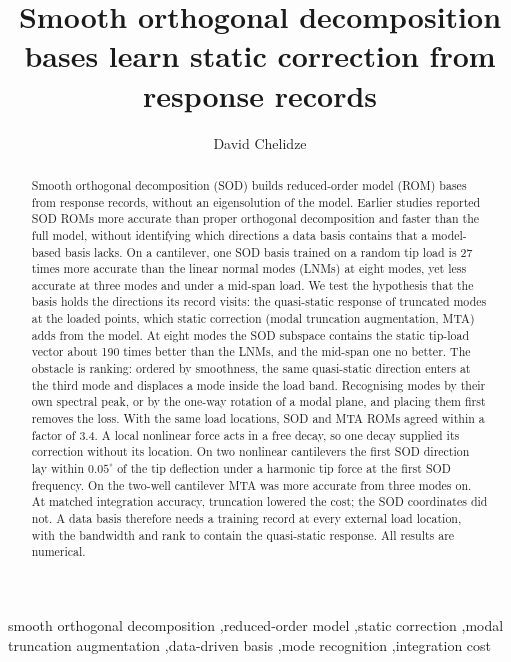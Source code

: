 \documentclass[preprint,12pt]{elsarticle}
\begin{document}
\begin{frontmatter}
\title{Smooth orthogonal decomposition bases learn static correction from response records}
\author[nld]{David Chelidze}


\begin{abstract}
Smooth orthogonal decomposition (SOD) builds reduced-order model (ROM) bases from response records, without an eigensolution of the model. Earlier studies reported SOD ROMs more accurate than proper orthogonal decomposition and faster than the full model, without identifying which directions a data basis contains that a model-based basis lacks.
On a cantilever, one SOD basis trained on a random tip load is 27 times more accurate than the linear normal modes (LNMs) at eight modes, yet less accurate at three modes and under a mid-span load.
We test the hypothesis that the basis holds the directions its record visits: the quasi-static response of truncated modes at the loaded points, which static correction (modal truncation augmentation, MTA) adds from the model.
At eight modes the SOD subspace contains the static tip-load vector about 190 times better than the LNMs, and the mid-span one no better.
The obstacle is ranking: ordered by smoothness, the same quasi-static direction enters at the third mode and displaces a mode inside the load band.
Recognising modes by their own spectral peak, or by the one-way rotation of a modal plane, and placing them first removes the loss.
With the same load locations, SOD and MTA ROMs agreed within a factor of 3.4.
A local nonlinear force acts in a free decay, so one decay supplied its correction without its location. On two nonlinear cantilevers the first SOD direction lay within $0.05^\circ$ of the tip deflection under a harmonic tip force at the first SOD frequency. On the two-well cantilever MTA was more accurate from three modes on.
At matched integration accuracy, truncation lowered the cost; the SOD coordinates did not.
A data basis therefore needs a training record at every external load location, with the bandwidth and rank to contain the quasi-static response. All results are numerical.
\end{abstract}

\begin{keyword}
smooth orthogonal decomposition \sep reduced-order model \sep static correction \sep modal truncation augmentation \sep data-driven basis \sep mode recognition \sep integration cost
\end{keyword}
\end{frontmatter}
\end{document}
